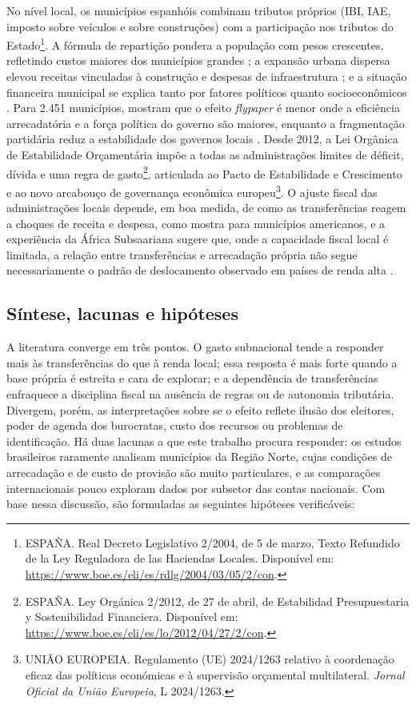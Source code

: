 No nível local, os municípios espanhóis combinam tributos próprios (IBI, IAE, imposto sobre veículos e sobre construções) com a participação nos tributos do Estado\footnote{ESPAÑA. Real Decreto Legislativo 2/2004, de 5 de marzo, Texto Refundido de la Ley Reguladora de las Haciendas Locales. Disponível em: \url{https://www.boe.es/eli/es/rdlg/2004/03/05/2/con}.}. A fórmula de repartição pondera a população com pesos crescentes, refletindo custos maiores dos municípios grandes \cite{soleolle2005}; a expansão urbana dispersa elevou receitas vinculadas à construção e despesas de infraestrutura \cite{hortasrico2014}; e a situação financeira municipal se explica tanto por fatores políticos quanto socioeconômicos \cite{bastida2009}. Para 2.451 municípios,  mostram que o efeito \textit{flypaper} é menor onde a eficiência arrecadatória e a força política do governo são maiores, enquanto a fragmentação partidária reduz a estabilidade dos governos locais \cite{carozzi2022}. Desde 2012, a Lei Orgânica de Estabilidade Orçamentária impõe a todas as administrações limites de déficit, dívida e uma regra de gasto\footnote{ESPAÑA. Ley Orgánica 2/2012, de 27 de abril, de Estabilidad Presupuestaria y Sostenibilidad Financiera. Disponível em: \url{https://www.boe.es/eli/es/lo/2012/04/27/2/con}.}, articulada ao Pacto de Estabilidade e Crescimento e ao novo arcabouço de governança econômica europeu\footnote{UNIÃO EUROPEIA. Regulamento (UE) 2024/1263 relativo à coordenação eficaz das políticas económicas e à supervisão orçamental multilateral. \textit{Jornal Oficial da União Europeia}, L 2024/1263.}. O ajuste fiscal das administrações locais depende, em boa medida, de como as transferências reagem a choques de receita e despesa, como mostra  para municípios americanos, e a experiência da África Subsaariana sugere que, onde a capacidade fiscal local é limitada, a relação entre transferências e arrecadação própria não segue necessariamente o padrão de deslocamento observado em países de renda alta \cite{masaki2018}.

\subsection{Síntese, lacunas e hipóteses}

A literatura converge em três pontos. O gasto subnacional tende a responder mais às transferências do que à renda local; essa resposta é mais forte quando a base própria é estreita e cara de explorar; e a dependência de transferências enfraquece a disciplina fiscal na ausência de regras ou de autonomia tributária. Divergem, porém, as interpretações sobre se o efeito reflete ilusão dos eleitores, poder de agenda dos burocratas, custo dos recursos ou problemas de identificação. Há duas lacunas a que este trabalho procura responder: os estudos brasileiros raramente analisam municípios da Região Norte, cujas condições de arrecadação e de custo de provisão são muito particulares, e as comparações internacionais pouco exploram dados por subsetor das contas nacionais. Com base nessa discussão, são formuladas as seguintes hipóteses verificáveis:

